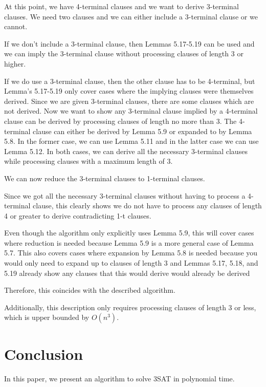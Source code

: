 \documentclass[manuscript]{acmart}
\begin{document}
    At this point, we have 4-terminal clauses and we want to derive 3-terminal
    clauses. We need two clauses and we can either include a 3-terminal clause
    or we cannot.

    If we don't include a 3-terminal clause, then Lemmas 5.17-5.19 can be
    used and we can imply the 3-terminal clause without processing clauses
    of length 3 or higher.

    If we do use a 3-terminal clause, then the other clause has to be 4-terminal,
    but Lemma's 5.17-5.19 only cover cases where the implying clauses were
    themselves derived. Since we are given 3-terminal clauses, there are some
    clauses which are not derived. Now we want to show any 3-terminal clause
    implied by a 4-terminal clause can be derived by processing clauses of length
    no more than 3. The 4-terminal clause can either be derived by Lemma 5.9 or
    expanded to by Lemma 5.8. In the former case, we can use Lemma 5.11 and in 
    the latter case we can use Lemma 5.12. In both cases, we can derive all the 
    necessary 3-terminal clauses while processing clauses with a maximum length
    of 3.

    We can now reduce the 3-terminal clauses to 1-terminal clauses.

    Since we got all the necessary 3-terminal clauses without having
    to process a 4-terminal clause, this clearly shows we do not
    have to process any clauses of length 4 or greater to derive contradicting 1-t
    clauses.
    
    Even though the algorithm only explicitly uses Lemma 5.9, this will
    cover cases where reduction is needed because Lemma 5.9 is a more
    general case of Lemma 5.7. This also covers cases where expansion by
    Lemma 5.8 is needed because you would only need to expand up to 
    clauses of length 3 and Lemmas 5.17, 5.18, and 5.19 already show
    any clauses that this would derive would already be derived

    Therefore, this coincides with the described algorithm.

    Additionally, this description only requires processing clauses
    of length 3 or less, which is upper bounded by $O(n^3)$.

    \section{Conclusion} 

    In this paper, we present an algorithm to solve 3SAT in polynomial time.
\end{document}
